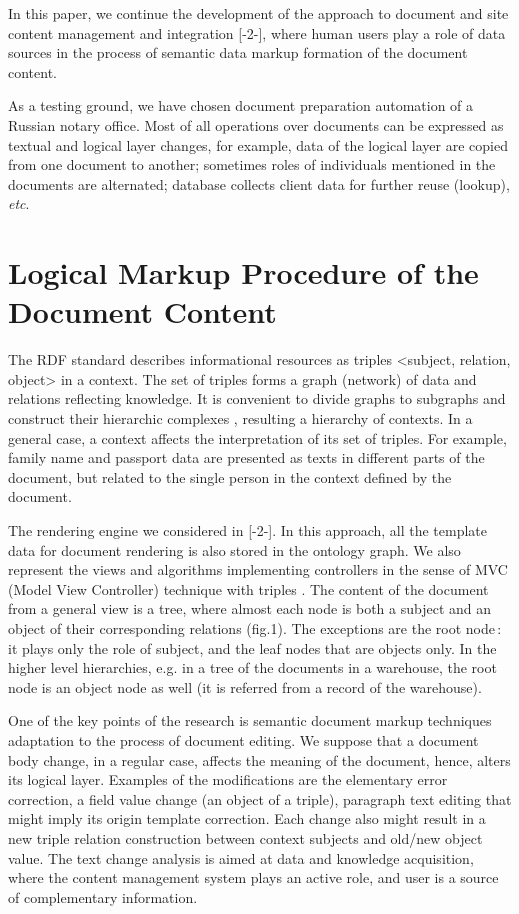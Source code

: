 \documentclass[conference]{IEEEtran}
\begin{document}
In this paper, we continue the development of the approach to document and site content management and integration [-2-], where human users play a role of data sources in the process of semantic data markup formation of the document content.

As a testing ground, we have chosen document preparation automation of a Russian notary office. Most of all operations over documents can be expressed as textual and logical layer changes, for example, data of the logical layer are copied from one document to another; sometimes roles of individuals mentioned in the documents are alternated; database collects client data for further reuse (lookup), \emph{etc}.

\section{Logical Markup Procedure of the Document Content}

The RDF standard describes informational resources as triples <subject, relation, object> in a context. The set of triples forms a graph (network) of data and relations reflecting knowledge. It is convenient to divide graphs to subgraphs and construct their hierarchic complexes \cite{b4}, resulting a hierarchy of contexts. In a general case, a context affects the interpretation of its set of triples. For example, family name and passport data are presented as texts in different parts of the document, but related to the single person in the context defined by the document.

The rendering engine we considered in [-2-]. In this approach, all the template data for document rendering is also stored in the ontology graph. We also represent the views and algorithms implementing controllers in the sense of MVC (Model View Controller) technique with triples \cite{b5}. The content of the document from a general view is a tree, where almost each node is both a subject and an object of their corresponding relations (fig.1). The exceptions are the root node\,: it plays only the role of subject, and the leaf nodes that are objects only. In the higher level hierarchies, e.g. in a tree of the documents in a warehouse, the root node is an object node as well (it is referred from a record of the warehouse).

One of the key points of the research is semantic document markup techniques adaptation to the process of document editing. We suppose that a document body change, in a regular case, affects the meaning of the document, hence, alters its logical layer. Examples of the modifications are the elementary error correction, a field value change (an object of a triple), paragraph text editing that might imply its origin template correction. Each change also might result in a new triple relation construction between context subjects and old/new object value. The text change analysis is aimed at data and knowledge acquisition, where the content management system plays an active role, and user is a source of complementary information.
\end{document}
